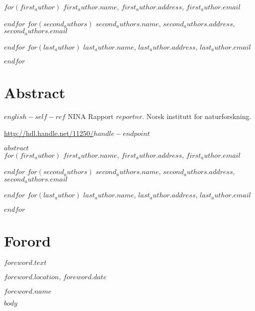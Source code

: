 \documentclass[11pt, a4paper]{article}
\renewcommand*{\href}[2]{\hyperref[#1]{\color{darkblue}\setulcolor{darkblue}\ul{\mbox{#2}}}}
\begin{document}
\vspace{1cm}
\small
$for(first_author)$
$first_author.name$, $first_author.address$, $first_author.email$  \par
$endfor$
$for(second_authors)$
$second_authors.name$, $second_authors.address$, $second_authors.email$  \par
$endfor$
$for(last_author)$
$last_author.name$, $last_author.address$, $last_author.email$  \par
$endfor$
\normalsize
\clearpage

\setcounter{secnumdepth}{0}
\section{Abstract}
\small{$english-self-ref$} NINA Rapport $reportnr$. Norsk institutt for naturforskning. \par\href{http://hdl.handle.net/11250/$handle-endpoint$}{http://hdl.handle.net/11250/$handle-endpoint$}\par
\vspace{0.5cm}
\normalsize{
$abstract$} \\

\vspace{1cm}
\small
$for(first_author)$
$first_author.name$, $first_author.address$, $first_author.email$  \par
$endfor$
$for(second_authors)$
$second_authors.name$, $second_authors.address$, $second_authors.email$  \par
$endfor$
$for(last_author)$
$last_author.name$, $last_author.address$, $last_author.email$  \par
$endfor$
\normalsize
\clearpage


\doublespacing
\tableofcontents
{}
\singlespacing
\clearpage

\section{Forord}

\normalsize
$foreword.text$\par
\medskip
$foreword.location$, $foreword.date$\par
\medskip
$foreword.name$



\clearpage
\setcounter{secnumdepth}{4}
\setlength{\parskip}{6pt}

$body$


\end{document}
